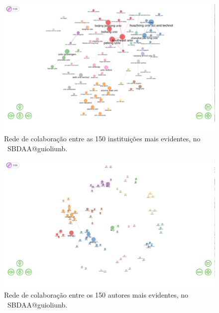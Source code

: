 \begin{figure}
    \centering
    \includegraphics[width=1\textwidth]{experiments/jhcf/PesqBibliogr/SimulacaoMultiagente/WoS-20220203/Estrutura/Social/MASSA2-Collaboration-Network-150instit.png}
    \caption{Rede de colaboração entre as 150 instituições mais evidentes, no  \dataset\ SBDAA@guioliunb.}
    \label{fig:MASSA2-Collaboration-Network-150instit}
\end{figure}

\begin{figure}
    \centering
    \includegraphics[width=1\textwidth]{experiments/jhcf/PesqBibliogr/SimulacaoMultiagente/WoS-20220203/Estrutura/Social/MASSA2-Collaboration-Network-150authors.png}
    \caption{Rede de colaboração entre os 150 autores mais evidentes, no  \dataset\ SBDAA@guioliunb.}
    \label{fig:MASSA2-Collaboration-Network-150authors}
\end{figure}

